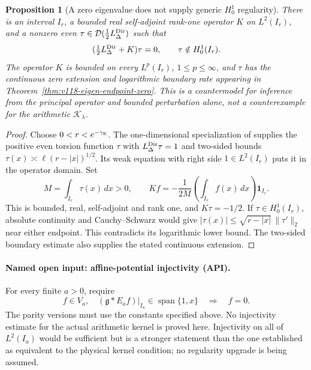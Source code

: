 \documentclass[11pt]{article}
\newtheorem{proposition}[theorem]{Proposition}
\theoremstyle{remark}
\begin{document}
\begin{proposition}[A zero eigenvalue does not supply generic $H_0^1$ regularity]
\label{prop:ns51-no-generic-bootstrap}
There is an interval $I_r$, a bounded real self-adjoint rank-one
operator $K$ on $L^2(I_r)$, and a nonzero even
$\tau\in\mathcal D(\tfrac12L_\Delta^{\rm Dir})$ such that
\[
 (\tfrac12L_\Delta^{\rm Dir}+K)\tau=0,
 \qquad \tau\notin H_0^1(I_r).
\]
The operator $K$ is bounded on every $L^p(I_r)$, $1\le p\le\infty$,
and $\tau$ has the continuous zero extension and logarithmic boundary
rate appearing in Theorem~\ref{thm:v118-eigen-endpoint-zero}.
This is a countermodel for inference from the principal operator and
bounded perturbation alone, not a counterexample for the arithmetic
$\mathcal K_\lambda$.
\end{proposition}
\begin{proof}
Choose $0<r<e^{-\gamma_{\rm E}}$. The one-dimensional specialization
of \cite[Theorem 1.2]{HLSLogBoundary} supplies the positive even torsion
function $\tau$ with $L_\Delta^{\rm Dir}\tau=1$ and two-sided bounds
$\tau(x)\asymp\ell(r-|x|)^{1/2}$. Its weak equation with right side
$1\in L^2(I_r)$ puts it in the operator domain. Set
\[
 M=\int_{I_r}\tau(x)\,dx>0,\qquad
 Kf=-\frac{1}{2M}\left(\int_{I_r}f(x)\,dx\right)\mathbf1_{I_r}.
\]
This is bounded, real, self-adjoint and rank one, and $K\tau=-1/2$.
If $\tau\in H_0^1(I_r)$, absolute continuity and Cauchy--Schwarz
would give $|\tau(x)|\le\sqrt{r-|x|}\,\|\tau'\|_2$ near either
endpoint. This contradicts its logarithmic lower bound. The two-sided
boundary estimate also supplies the stated continuous extension.
\end{proof}

\paragraph{Named open input: affine-potential injectivity (API).}
For every finite $a>0$, require
\begin{equation}\label{eq:ns51-api}
 f\in V_a,\quad (\mathfrak g*E_af)|_{I_a}\in
 \operatorname{span}\{1,x\}\quad\Longrightarrow\quad f=0.
\end{equation}
The parity versions must use the constants specified above. No
injectivity estimate for the actual arithmetic kernel is proved here.
Injectivity on all of $L^2(I_a)$ would be sufficient but is a stronger
statement than the one established as equivalent to the physical
kernel condition; no regularity upgrade is being assumed.
\end{document}
